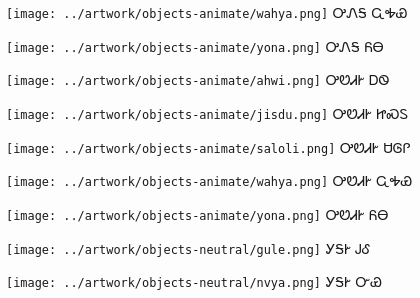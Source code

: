 \documentclass[avery5371,frame]{flashcards}%
\begin{document}
\begin{flashcard}{
\texttt{[image: ../artwork/objects-animate/wahya.png]}
}\Huge ᎤᏁᎦ ᏩᎭᏯ
\end{flashcard}

\begin{flashcard}{
\texttt{[image: ../artwork/objects-animate/yona.png]}
}\Huge ᎤᏁᎦ ᏲᎾ
\end{flashcard}

\begin{flashcard}{
\texttt{[image: ../artwork/objects-animate/ahwi.png]}
}\Huge ᎤᏬᏗᎨ ᎠᏫ
\end{flashcard}

\begin{flashcard}{
\texttt{[image: ../artwork/objects-animate/jisdu.png]}
}\Huge ᎤᏬᏗᎨ ᏥᏍᏚ
\end{flashcard}

\begin{flashcard}{
\texttt{[image: ../artwork/objects-animate/saloli.png]}
}\Huge ᎤᏬᏗᎨ ᏌᎶᎵ
\end{flashcard}

\begin{flashcard}{
\texttt{[image: ../artwork/objects-animate/wahya.png]}
}\Huge ᎤᏬᏗᎨ ᏩᎭᏯ
\end{flashcard}

\begin{flashcard}{
\texttt{[image: ../artwork/objects-animate/yona.png]}
}\Huge ᎤᏬᏗᎨ ᏲᎾ
\end{flashcard}

\begin{flashcard}{
\texttt{[image: ../artwork/objects-neutral/gule.png]}
}\Huge ᎩᎦᎨ ᎫᎴ
\end{flashcard}

\begin{flashcard}{
\texttt{[image: ../artwork/objects-neutral/nvya.png]}
}\Huge ᎩᎦᎨ ᏅᏯ
\end{flashcard}
\end{document}
